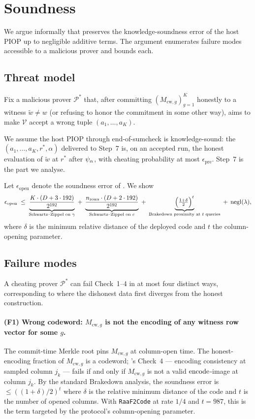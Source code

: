 \section{Soundness}
\label{sec:soundness}

We argue informally that  preserves the
knowledge-soundness error of the host PIOP up to negligible additive
terms. The argument enumerates failure modes accessible to a
malicious prover and bounds each.

\subsection{Threat model}

Fix a malicious prover $\mathcal{P}^*$ that, after committing
$(M_{\mathrm{cw}, g})_{g=1}^{K}$ honestly to a witness
$\widetilde{w} \ne w$ (or refusing to honor the commitment in some
other way), aims to make $\mathcal{V}$ accept a wrong tuple
$(a_1, \ldots, a_K)$.

We assume the host PIOP through end-of-sumcheck is knowledge-sound:
the $(a_1, \ldots, a_K, r^*, \alpha)$ delivered to Step~7 is, on an
accepted run, the honest evaluation of $\widetilde{w}$ at $r^*$ after
$\psi_{\alpha}$, with cheating probability at most
$\epsilon_{\mathrm{pre}}$. Step~7 is the part we analyse.

Let $\epsilon_{\mathrm{open}}$ denote the soundness error of
. We show
\[
  \epsilon_{\mathrm{open}}
  \;\le\;
  \underbrace{\frac{K \cdot (D + 3 \cdot 192)}{2^{192}}}_{\text{Schwartz–Zippel on $\gamma$}}
  \;+\;
  \underbrace{\frac{n_{\mathrm{rows}} \cdot (D + 2 \cdot 192)}{2^{192}}}_{\text{Schwartz–Zippel on $c$}}
  \;+\;
  \underbrace{\Bigl(\tfrac{1+\delta}{2}\Bigr)^{t}}_{\text{Brakedown proximity at $t$ queries}}
  \;+\;
  \operatorname{negl}(\lambda),
\]
where $\delta$ is the minimum relative distance of the deployed code
and $t$ the column-opening parameter.

\subsection{Failure modes}

A cheating prover $\mathcal{P}^*$ can fail Check~1--4 in at most four
distinct ways, corresponding to where the dishonest data first
diverges from the honest construction.

\paragraph{(F1) Wrong codeword: $M_{\mathrm{cw}, g}$ is not the
encoding of any witness row vector for some $g$.} The commit-time
Merkle root pins $M_{\mathrm{cw}, g}$ at column-open time. The
honest-encoding fraction of $M_{\mathrm{cw}, g}$ is a codeword;
's Check~4 — encoding consistency at sampled column
$j_k$ — fails if and only if $M_{\mathrm{cw}, g}$ is not a valid
$\operatorname{encode}$-image at column $j_k$. By the standard Brakedown analysis,
the soundness error is $\le ((1+\delta)/2)^t$ where $\delta$ is the
relative minimum distance of the code and $t$ is the number of opened
columns. With \texttt{RaaF2Code} at rate $1/4$ and $t = 987$, this is
the term targeted by the protocol's column-opening parameter.

